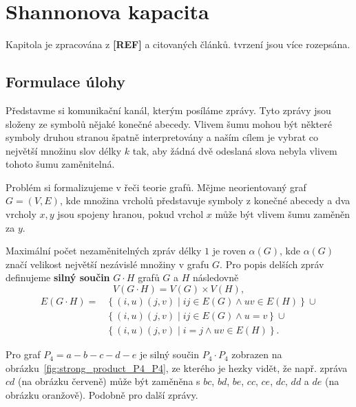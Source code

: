 \chapter{Shannonova kapacita}

Kapitola je zpracována z \textbf{[REF]} a citovaných článků.  tvrzení jsou více rozepsána.

\section{Formulace úlohy}

Představme si komunikační kanál, kterým posíláme zprávy. Tyto zprávy jsou složeny ze symbolů nějaké konečné abecedy. Vlivem šumu mohou být některé symboly druhou stranou špatně interpretovány a naším cílem je vybrat co největší množinu slov délky $k$ tak, aby žádná dvě odeslaná slova nebyla vlivem tohoto šumu zaměnitelná.

Problém si formalizujeme v řeči teorie grafů. Mějme neorientovaný graf $G = (V, E)$, kde množina vrcholů představuje symboly z konečné abecedy a dva vrcholy $x, y$ jsou spojeny hranou, pokud vrchol $x$ může být vlivem šumu zaměněn za $y$.

Maximální počet nezaměnitelných zpráv délky $1$ je roven $\alpha(G)$, kde $\alpha(G)$ značí velikost největší nezávislé množiny v grafu $G$. Pro popis delších zpráv definujeme \textbf{silný součin} $G \cdot H$ grafů $G$ a $H$ následovně
\begin{equation*}
    V(G \cdot H) = V(G) \times V(H),
\end{equation*}
\begin{equation*}
    \begin{split}
    E(G \cdot H) = &\left\{ (i,u)(j,v) \mid ij \in E(G) \wedge uv \in E(H) \right\} \cup \\
                   &\left\{ (i,u)(j,v) \mid ij \in E(G) \wedge u = v \right\} \cup \\
                   &\left\{ (i,u)(j,v) \mid i = j \wedge uv \in E(H) \right\}.
    \end{split}
\end{equation*}

\begin{pr}
Pro graf $P_4 = a-b-c-d-e$ je silný součin $P_4 \cdot P_4$ zobrazen na obrázku~\ref{fig:strong_product_P4_P4}, ze kterého je hezky vidět, že např. zpráva $cd$ (na obrázku červeně) může být zaměněna s $bc$, $bd$, $be$, $cc$, $ce$, $dc$, $dd$ a $de$ (na obrázku oranžově). Podobně pro další zprávy.
\end{pr}

